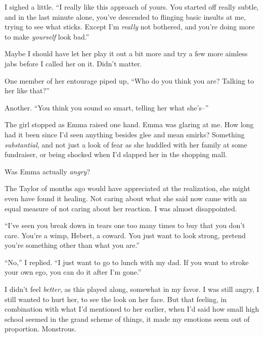 I sighed a little.  ``I really like this approach of yours.  You started off really subtle, and in the last minute alone, you've descended to flinging basic insults at me, trying to see what sticks.  Except I'm \emph{really} not bothered, and you're doing more to make \emph{yourself} look bad.''



Maybe I should have let her play it out a bit more and try a few more aimless jabs before I called her on it.  Didn't matter.



One member of her entourage piped up, ``Who do you think you are?  Talking to her like that?''



Another.  ``You think you sound so smart, telling her what she's--''



The girl stopped as Emma raised one hand.  Emma was glaring at me.  How long had it been since I'd seen anything besides glee and mean smirks?  Something \emph{substantial}, and not just a look of fear as she huddled with her family at some fundraiser, or being shocked when I'd slapped her in the shopping mall.



Was Emma actually \emph{angry}?



The Taylor of months ago would have appreciated at the realization, she might even have found it healing.  Not caring about what she said now came with an equal measure of not caring about her reaction.  I was almost disappointed.



``I've seen you break down in tears one too many times to buy that you don't care.  You're a wimp, Hebert, a coward.  You just want to look strong, pretend you're something other than what you are.''



``No,'' I replied.  ``I just want to go to lunch with my dad.  If you want to stroke your own ego, you can do it after I'm gone.''



I didn't feel \emph{better}, as this played along, somewhat in my favor.  I was still angry, I still wanted to hurt her, to see the look on her face.  But that feeling, in combination with what I'd mentioned to her earlier, when I'd said how small high school seemed in the grand scheme of things, it made my emotions seem out of proportion.  Monstrous.



